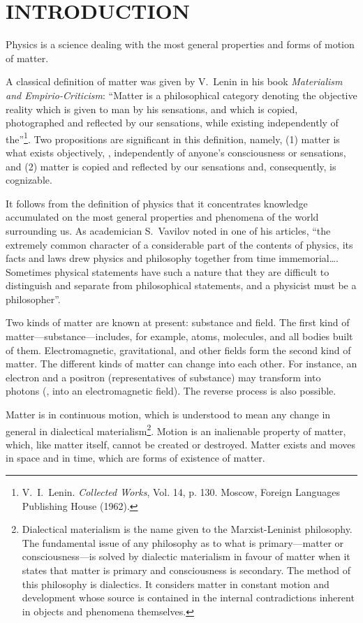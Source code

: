 

\chapter*{INTRODUCTION}\label{chap:chapter_introduction}

Physics is a science dealing with the most general properties and forms of motion of matter.

A classical definition of matter was given by V.~Lenin in his book \textit{Materialism and Empirio-Criticism}: ``Matter is a philosophical category denoting the objective reality which is given to man by his sensations, and which is copied, photographed and reflected by our sensations, while existing independently of the''\footnote{V.~I.~Lenin. \textit{Collected Works}, Vol. 14, p. 130. Moscow, Foreign Languages Publishing House (1962).}. Two propositions are significant in this definition, namely, (1) matter is what exists objectively, \ie, independently of anyone's consciousness or sensations, and (2) matter is copied and reflected by our sensations and, consequently, is cognizable.

It follows from the definition of physics that it concentrates knowledge accumulated on the most general properties and phenomena of the world surrounding us. As academician S.~Vavilov noted in one of his articles, ``the extremely common character of a considerable part of the contents of physics, its facts and laws drew physics and philosophy together from time immemorial\ldots. Sometimes physical statements have such a nature that they are difficult to distinguish and separate from philosophical statements, and a physicist must be a philosopher''.

Two kinds of matter are known at present: substance and field. The first kind of matter---substance---includes, for example, atoms, molecules, and all bodies built of them. Electromagnetic, gravitational, and other fields form the second kind of matter. The different kinds of matter can change into each other. For instance, an electron and a positron (representatives of substance) may transform into photons (\ie, into an electromagnetic field). The reverse process is also possible.

Matter is in continuous motion, which is understood to mean any change in general in dialectical materialism\footnote{Dialectical materialism is the name given to the Marxist-Leninist philosophy. The fundamental issue of any philosophy as to what is primary---matter or consciousness---is solved by dialectic materialism in favour of matter when it states that matter is primary and consciousness is secondary. The method of this philosophy is dialectics. It considers matter in constant motion and development whose source is contained in the internal contradictions inherent in objects and phenomena themselves.}. Motion is an inalienable property of matter, which, like matter itself, cannot be created or destroyed. Matter exists and moves in space and in time, which are forms of existence of matter.

